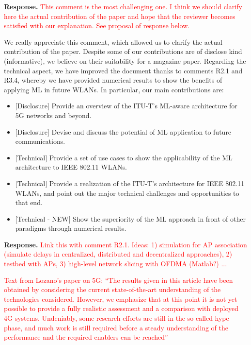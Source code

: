 \documentclass[a4paper,twoside,11pt]{reviewresponse}
\begin{document}
	\textbf{Response.} \textcolor{red}{This comment is the most challenging one. I think we should clarify here the actual contribution of the paper and hope that the reviewer becomes satisfied with our explanation. See proposal of response below.}
	
	We really appreciate this comment, which allowed us to clarify the actual contribution of the paper. Despite some of our contributions are of disclose kind (informative), we believe on their suitability for a magazine paper. Regarding the technical aspect, we have improved the document thanks to comments R2.1 and R3.4, whereby we have provided numerical results to show the benefits of applying ML in future WLANs. In particular, our main contributions are:
	\begin{itemize}
		\item $[$Disclosure$]$ Provide an overview of the ITU-T's ML-aware architecture for 5G networks and beyond.
		\item $[$Disclosure$]$ Devise and discuss the potential of ML application to future communications. 
		\item $[$Technical$]$ Provide a set of use cases to show the applicability of the ML architecture to IEEE 802.11 WLANs.
		\item $[$Technical$]$ Provide a realization of the ITU-T's architecture for IEEE 802.11 WLANs, and point out the major technical challenges and opportunities to that end. 
		\item $[$Technical - NEW$]$ Show the superiority of the ML approach in front of other paradigms through numerical results. 
	\end{itemize}
		
	
	\textbf{Response.} \textcolor{red}{Link this with comment R2.1. Ideas: 1) simulation for AP association (simulate delays in centralized, distributed and decentralized approaches), 2) testbed with APs, 3) high-level network slicing with OFDMA (Matlab?) ...}
	
	\textcolor{red}{Text from Lozano's paper on 5G: ``The results given in this	article have been obtained by considering the current state-of-the-art understanding of the technologies considered. However, we emphasize that at this point it is not yet possible to provide a fully realistic assessment and a comparison with deployed 4G systems. Undeniably, some research efforts are still in	the so-called hype phase, and much work is still required before a steady	understanding of the performance and the required enablers can be reached''}
	
	\clearpage
	
%	
%	
	
\end{document}
